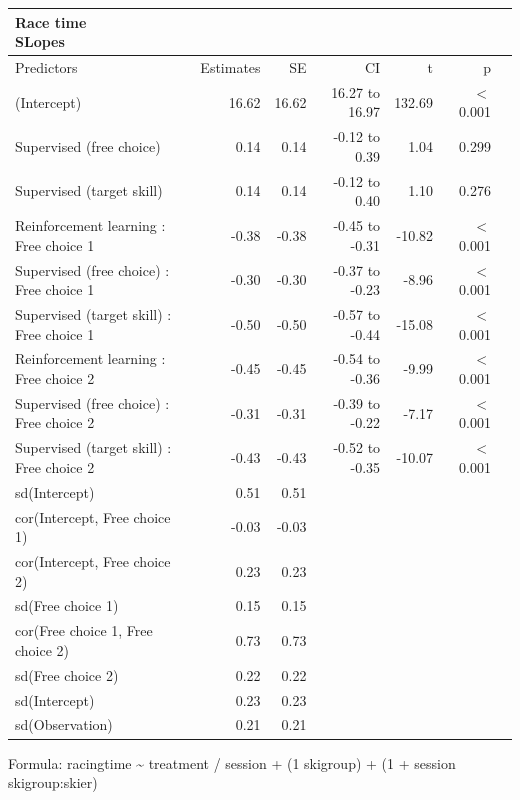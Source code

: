 \documentclass[pdflatex,sn-mathphys-num]{sn-jnl}%
\theoremstyle{thmstyleone}%
\theoremstyle{thmstyletwo}%
\theoremstyle{thmstylethree}%
\begin{document}
\begin{appendices}
\setlength{\LTpost}{0mm}
\begin{longtable}{lrrrrrl}\label{suptable_racetime_changepergroup}
\caption*{
{\large Race time} \\ 
{\small SLopes}
} \\ 
\toprule
Predictors & Estimates & SE & CI & t & p \\ 
\midrule\addlinespace[2.5pt]
(Intercept) & 16.62 & 16.62 & 16.27 to 16.97 & 132.69 &  $<$  0.001 \\ 
Supervised (free choice) & 0.14 & 0.14 & -0.12 to 0.39 & 1.04 & 0.299 \\ 
Supervised (target skill)  & 0.14 & 0.14 & -0.12 to 0.40 & 1.10 & 0.276 \\ 
Reinforcement learning : Free choice 1 & -0.38 & -0.38 & -0.45 to -0.31 & -10.82 &  $<$  0.001 \\ 
Supervised (free choice) : Free choice 1 & -0.30 & -0.30 & -0.37 to -0.23 & -8.96 &  $<$  0.001 \\ 
Supervised (target skill)  : Free choice 1 & -0.50 & -0.50 & -0.57 to -0.44 & -15.08 &  $<$  0.001 \\ 
Reinforcement learning : Free choice 2 & -0.45 & -0.45 & -0.54 to -0.36 & -9.99 &  $<$  0.001 \\ 
Supervised (free choice) : Free choice 2 & -0.31 & -0.31 & -0.39 to -0.22 & -7.17 &  $<$  0.001 \\ 
Supervised (target skill)  : Free choice 2 & -0.43 & -0.43 & -0.52 to -0.35 & -10.07 &  $<$  0.001 \\ 
sd(Intercept) & 0.51 & 0.51 &  &  &  &  \\ 
cor(Intercept, Free choice 1) & -0.03 & -0.03 &  &  &  &  \\ 
cor(Intercept, Free choice 2) & 0.23 & 0.23 &  &  &  &  \\ 
sd(Free choice 1) & 0.15 & 0.15 & & & &  \\ 
cor(Free choice 1, Free choice 2) & 0.73 & 0.73 & & & &  \\ 
sd(Free choice 2) & 0.22 & 0.22 &  &  &  &  \\ 
sd(Intercept) & 0.23 & 0.23 & &  &  &  \\ 
sd(Observation) & 0.21 & 0.21 & & &  &  \\ 
\bottomrule
\end{longtable}
\begin{minipage}{\linewidth}
Formula: racingtime \textasciitilde{} treatment / session + (1  \textbar{} skigroup) + (1 + session \textbar{} skigroup:skier)\\
\end{minipage}


\end{appendices}
\end{document}
